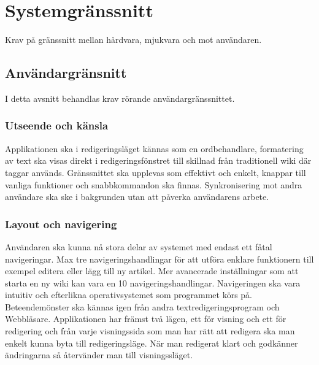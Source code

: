 
\section{Systemgränssnitt}
Krav på gränssnitt mellan hårdvara, mjukvara och mot användaren. 

\subsection{Användargränsnitt}
I detta avsnitt behandlas krav rörande användargränssnittet. 

\subsubsection{Utseende och känsla}
Applikationen ska i redigeringsläget kännas som en ordbehandlare, formatering av text ska visas direkt i redigeringsfönstret till skillnad från traditionell wiki där taggar används. Gränssnittet ska upplevas som effektivt och enkelt, knappar till vanliga funktioner och snabbkommandon ska finnas. Synkronisering mot andra användare ska ske i bakgrunden utan att påverka användarens arbete. 

\subsubsection{Layout och navigering}
Användaren ska kunna nå stora delar av systemet med endast ett fåtal navigeringar. Max tre navigeringshandlingar för att utföra enklare funktionern till exempel editera eller lägg till ny artikel. Mer avancerade inställningar som att starta en ny wiki kan vara en 10 navigeringshandlingar. Navigeringen ska vara intuitiv och efterlikna operativsystemet som programmet körs på. Beteendemönster ska kännas igen från andra textredigeringsprogram och Webbläsare. Applikationen har främst två lägen, ett för visning och ett för redigering och från varje visningssida som man har rätt att redigera ska man enkelt kunna byta till redigeringsläge. När man redigerat klart och godkänner ändringarna så återvänder man till visningssläget.


